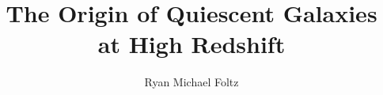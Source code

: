 \documentclass[oneside,final,letterpaper,10pt]{ucr}
\def\dsp{\def\baselinestretch{2.0}\large\normalsize} \dsp
\begin{document}
\title{The Origin of Quiescent Galaxies at High Redshift}
\author{Ryan Michael Foltz}

\maketitle
\copyrightpage{}
\approvalpage{}


\begin{frontmatter}







\tableofcontents
\newpage
\listoffigures
\newpage
\listoftables
\end{frontmatter}









\newpage


\newcommand\newblock{\hskip .11em\@plus.33em\@minus.07em}

\def\dsp{\def\baselinestretch{1.0}\large\normalsize} \dsp


\end{document}
